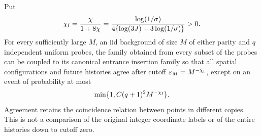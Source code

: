 \documentclass[11pt,letterpaper]{article}
\begin{document}
\begin{lemma}
\label{lem:finite-family-rate}
Put
\[
 \chi_{\rm f}=\frac{\chi}{1+8\chi}
   =\frac{\log(1/\sigma)}
          {4\{\log(3J)+3\log(1/\sigma)\}}>0.
\]
For every sufficiently large $M$, an iid background of size $M$ of
either parity and $q$ independent
uniform probes, the family obtained from every subset of the probes
can be coupled to its canonical entrance insertion family so that
all spatial configurations and future histories agree after cutoff
$\varepsilon_M=M^{-\chi_{\rm f}}$, except on an event of probability
at most
\begin{equation}\label{eq:finite-family-rate}
 \min\{1,C(q+1)^2 M^{-\chi_{\rm f}}\}.
\end{equation}
Agreement retains the coincidence relation between points in different
copies. This is not a comparison of the original integer coordinate
labels or of the entire histories down to cutoff zero.
\end{lemma}
\end{document}

